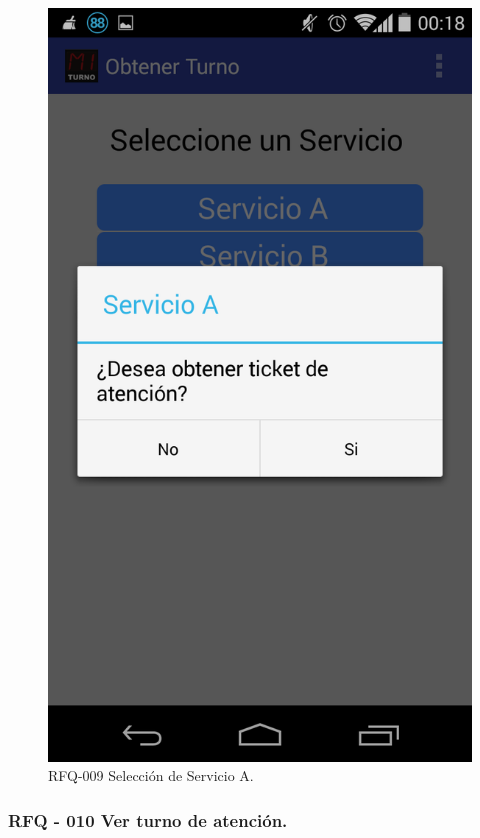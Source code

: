 \begin{figure}[H]
\centering
\includegraphics[scale=0.20]{images/capitulo6/rfq009.png}
\caption{RFQ-009 Selección de Servicio A.}
\label{rfq009}
\end{figure}

\subsubsection{RFQ - 010 Ver turno de atención.}

